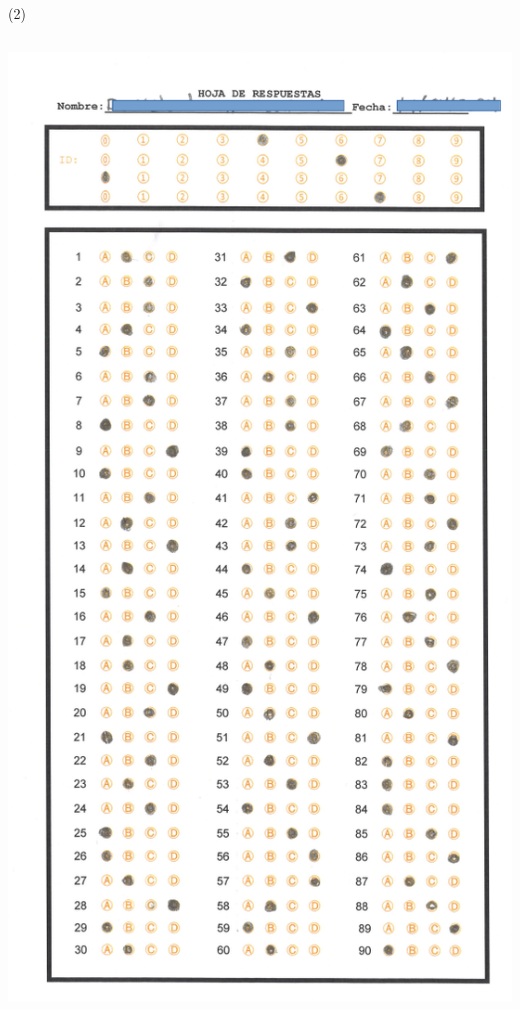 \begin{frame}{\citetitle{\EntradaBibtex} (2)}
\begin{columns}
\begin{center}
		\includegraphics[width=0.90\linewidth]{2024_ProyectoCalificadorExamenes/figs/ExamenES1.png}
\end{center}

\end{columns}

\end{frame}


